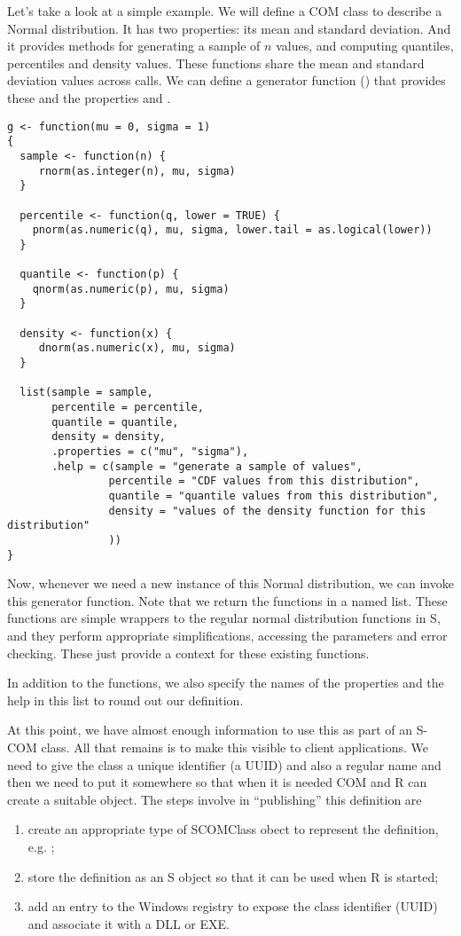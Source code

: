 \documentclass[11pt]{article}
\begin{document}
Let's take a look at a simple example.  We will define a COM class to
describe a Normal distribution. It has two properties: its mean and
standard deviation. And it provides methods for generating a sample of
$n$ values, and computing quantiles, percentiles and density values.
These functions share the mean and standard deviation values across
calls. We can define a generator function () that
provides these and the properties  and
.
\begin{verbatim}
g <- function(mu = 0, sigma = 1) 
{
  sample <- function(n) {
     rnorm(as.integer(n), mu, sigma)
  }

  percentile <- function(q, lower = TRUE) {
    pnorm(as.numeric(q), mu, sigma, lower.tail = as.logical(lower))
  }

  quantile <- function(p) {
    qnorm(as.numeric(p), mu, sigma)
  }

  density <- function(x) {
     dnorm(as.numeric(x), mu, sigma)
  }

  list(sample = sample, 
       percentile = percentile,
       quantile = quantile, 
       density = density,
       .properties = c("mu", "sigma"),
       .help = c(sample = "generate a sample of values",
                percentile = "CDF values from this distribution",
                quantile = "quantile values from this distribution",
                density = "values of the density function for this distribution"
                ))
}
\end{verbatim}
Now, whenever we need a new instance of this Normal distribution, we
can invoke this generator function.  Note that we return the functions
in a named list.  These functions are simple wrappers to the regular
normal distribution functions in S, and they perform appropriate
simplifications, accessing the parameters and error checking.  
These just provide a context for these existing functions.

In addition to the functions, we also specify the names of the
properties and the help in this list to round out our definition.

At this point, we have almost enough information to use this as part
of an S-COM class.  All that remains is to make this visible to client
applications.  We need to give the class a unique identifier (a UUID)
and also a regular name and then we need to put it somewhere so that
when it is needed COM and R can create a suitable object.
The steps involve in ``publishing'' this definition
are
\begin{enumerate}
\item create an appropriate type of SCOMClass obect
  to represent the definition, e.g. ;
\item store the definition as an S object so that it can be  used
  when R is started;
\item add an entry to the Windows registry to expose
 the class identifier (UUID) and associate it with a DLL or EXE.
\end{enumerate}
\end{document}
